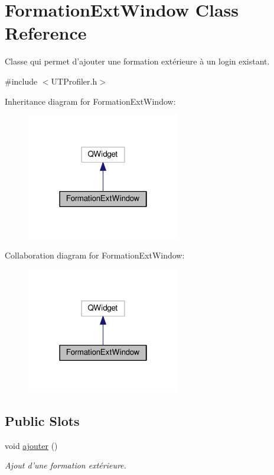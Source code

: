 \hypertarget{class_formation_ext_window}{\section{Formation\-Ext\-Window Class Reference}
\label{class_formation_ext_window}
}


Classe qui permet d'ajouter une formation extérieure à un login existant.  




{\ttfamily \#include $<$U\-T\-Profiler.\-h$>$}



Inheritance diagram for Formation\-Ext\-Window\-:
\nopagebreak
\begin{figure}[H]
\begin{center}
\leavevmode
\includegraphics[width=190pt]{class_formation_ext_window__inherit__graph}
\end{center}
\end{figure}


Collaboration diagram for Formation\-Ext\-Window\-:
\nopagebreak
\begin{figure}[H]
\begin{center}
\leavevmode
\includegraphics[width=190pt]{class_formation_ext_window__coll__graph}
\end{center}
\end{figure}
\subsection*{Public Slots}
\begin{DoxyCompactItemize}
\item 
void \hyperlink{class_formation_ext_window_a3125317a28eca3c336bd85318c9e335e}{ajouter} ()
\begin{DoxyCompactList}\small\item\em Ajout d'une formation extérieure. \end{DoxyCompactList}\end{DoxyCompactItemize}
